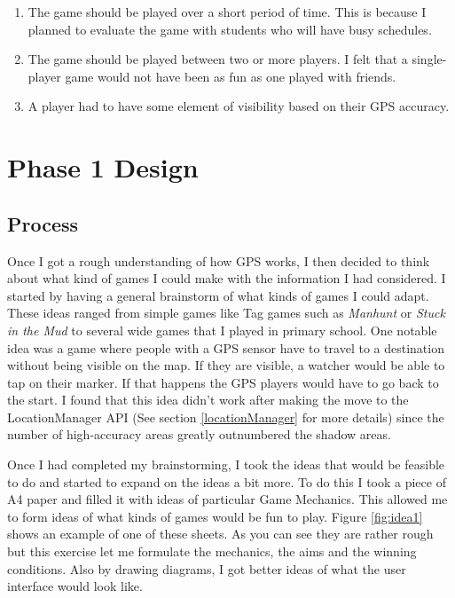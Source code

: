 \documentclass{l4proj}
\begin{document}
\begin{enumerate}
    \item The game should be played over a short period of time. This is because I planned to evaluate the game with students who will have busy schedules.
    \item The game should be played between two or more players. I felt that a single-player game would not have been as fun as one played with friends.
    \item A player had to have some element of visibility based on their GPS accuracy. 
\end{enumerate}

\chapter{Phase 1 Design}
\label{phase1design}

\section{Process}
\label{phase1designprocess}
Once I got a rough understanding of how GPS works, I then decided to think about what kind of games I could make
with the information I had considered. I started by having a general brainstorm of what kinds of games I could adapt.
These ideas ranged from simple games like Tag games such as \emph{Manhunt} or \emph{Stuck in the Mud} to several wide
games that I played in primary school. One notable idea was a game where people with a GPS sensor have to travel to a
destination without being visible on the map. If they are visible, a watcher would be able to tap on their marker. If
that happens the GPS players would have to go back to the start. I found that this idea didn't work after making the
move to the LocationManager API (See section \ref{locationManager} for more details) since the number of high-accuracy
areas greatly outnumbered the shadow areas.

Once I had completed my brainstorming, I took the ideas that would be feasible to do and started to expand on the ideas a
bit more. To do this I took a piece of A4 paper and filled it with ideas of particular Game Mechanics. This allowed me
to form ideas of what kinds of games would be fun to play. Figure \ref{fig:idea1} shows an example of one of these sheets.
As you can see they are rather rough but this exercise let me formulate the mechanics, the aims and the winning conditions.
Also by drawing diagrams, I got better ideas of what the user interface would look like.
\end{document}
